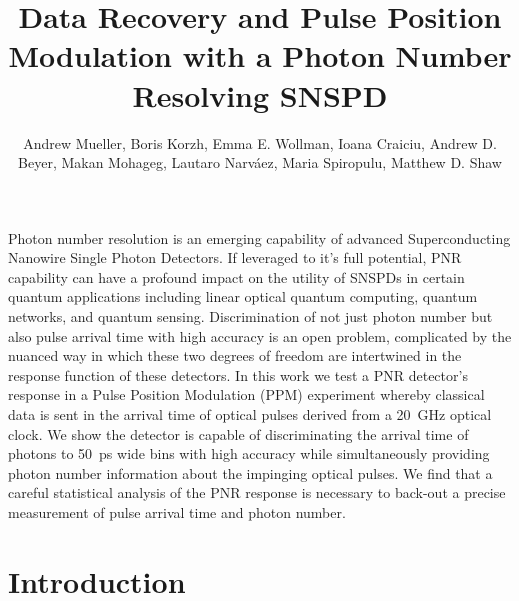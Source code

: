 \documentclass{optica-article}
\begin{document}
\title{Data Recovery and Pulse Position Modulation with a Photon Number Resolving SNSPD}

\author{Andrew Mueller, Boris Korzh, Emma E. Wollman, Ioana Craiciu, Andrew D. Beyer, Makan Mohageg, {Lautaro Narv\'aez},  Maria Spiropulu, Matthew D. Shaw}


\address{Applied Physics, California Institute of Technology, 1200 E California Blvd., Pasadena, CA, 91125, USA \\
Jet Propulsion Laboratory, California Institute of Technology, 4800 Oak Grove Dr., Pasadena, CA, 91109, USA\\
Division of Physics, Mathematics and Astronomy, California Institute of Technology, 1200 E California Blvd., Pasadena, CA 91125, USA}



\begin{abstract*} 
Photon number resolution is an emerging capability of advanced Superconducting Nanowire Single Photon Detectors. If leveraged to it's full potential, PNR capability can have a profound impact on the utility of SNSPDs in certain quantum applications including linear optical quantum computing, quantum networks, and quantum sensing. Discrimination of not just photon number but also pulse arrival time with high accuracy is an open problem, complicated by the nuanced way in which these two degrees of freedom are intertwined in the response function of these detectors. In this work we test a PNR detector's response in a Pulse Position Modulation (PPM) experiment whereby classical data is sent in the arrival time of optical pulses derived from a 20~GHz optical clock. We show the detector is capable of discriminating the arrival time of photons to 50~ps wide bins with high accuracy while simultaneously providing photon number information about the impinging optical pulses. We find that a careful statistical analysis of the PNR response is necessary to back-out a precise measurement of pulse arrival time and photon number.
\end{abstract*}

\hypertarget{introduction}{%
\section{Introduction}\label{introduction}}
\end{document}
